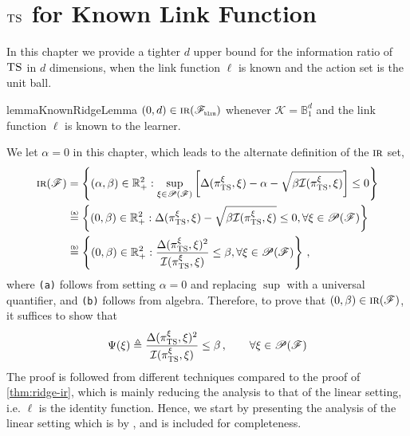 \documentclass[letter, 12pt]{report}
\newcommand{\pr}{\text{\tiny\texttt{r}}}
\newcommand{\pb}{\text{\tiny\texttt{b}}}
\newcommand{\pl}{\text{\tiny\texttt{l}}}
\renewcommand{\pm}{\text{\tiny\texttt{m}}}
\newcommand{\R}{\mathbb R}
\newcommand{\explan}[1]{\stackrel{\text{\tiny \texttt{#1}}}}
\newcommand{\ball}{\mathbb{B}}
\newcommand{\cK}{\mathcal K}
\newcommand{\sF}{\mathscr F}
\newcommand{\sP}{\mathscr P}
\newcommand{\I}{\mathcal{I}}
\newcommand{\1}{\mathbf{1}}
\newcommand{\IR}{\operatorname{\textsc{ir}}}
\newcommand{\ts}{\textsc{TS}\xspace}
\theoremstyle{plain}
\theoremstyle{definition}
\theoremstyle{remark}
\begin{document}
\chapter{$\ts$ for Known Link Function}
In this chapter we provide a tighter $d$ upper bound for the
information ratio of $\ts$ in $d$ dimensions, when the link function
$\ell$ is known and the action set is the unit ball.

\begin{restatable}{lemma}{KnownRidgeLemma}\label{thm:ridge-known-ir}
    $(0, d) \in \IR(\sF_{\pb\pl\pr\pm})$ whenever $\cK = \ball_1^d$ and
    the link function $\ell$ is known to the learner.
\end{restatable}
We let $\alpha=0$ in this chapter, which leads to the alternate definition
of the $\IR$ set,
\begin{align}
    \IR(\sF)
     & = \left\{(\alpha, \beta) \in \R_+^2 : \sup_{\xi \in \sP(\sF)} \left[\Delta(\pi^\xi_\ts, \xi) - \alpha - \sqrt{\beta \I(\pi^\xi_\ts, \xi)}\right] \leq 0 \right\} \nonumber \\
     & \explan{(a)}= \left\{(0, \beta) \in \R_+^2 : \Delta(\pi^\xi_\ts, \xi) - \sqrt{\beta \I(\pi^\xi_\ts, \xi)} \leq 0, \forall \xi \in \sP(\sF) \right\}              \nonumber \\
     & \explan{(b)}= \left\{(0, \beta) \in \R_+^2 : \frac{\Delta(\pi^\xi_\ts, \xi)^2}{\I(\pi^\xi_\ts, \xi)} \leq \beta, \forall \xi \in \sP(\sF) \right\}\,, \nonumber
\end{align}
where \texttt{(a)} follows from setting $\alpha=0$ and
replacing $\sup$ with a universal quantifier,
and \texttt{(b)} follows from algebra.
Therefore, to prove that $(0, \beta) \in \IR(\sF)$, it suffices to show that
\begin{align}
    \Psi(\xi) \triangleq
    \frac{\Delta(\pi^\xi_\ts, \xi)^2}{\I(\pi^\xi_\ts, \xi)} \leq \beta\,,\qquad \forall \xi \in \sP(\sF)
    \label{eq:IR-alpha-0}
\end{align}
The proof is followed from different techniques compared to
the proof of \cref{thm:ridge-ir}, which is mainly reducing the analysis
to that of the linear setting, i.e. $\ell$ is the identity function.
Hence, we start by presenting the analysis of the linear setting
which is by \cite{RV16}, and is included for completeness.
\end{document}
